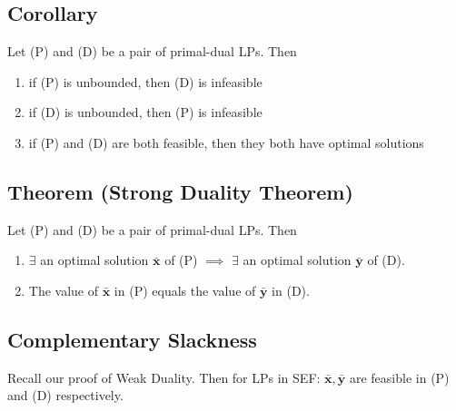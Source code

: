 \begin{thmbox}
    \subsection{Corollary}
    Let (P) and (D) be a pair of primal-dual LPs. Then
    \begin{enumerate}[(1)]
        \item if (P) is unbounded, then (D) is infeasible
        \item if (D) is unbounded, then (P) is infeasible
        \item if (P) and (D) are both feasible, then they both
        have optimal solutions
    \end{enumerate}
\end{thmbox}

\begin{thmbox}
    \subsection{Theorem (Strong Duality Theorem)}
    Let (P) and (D) be a pair of primal-dual LPs. Then
    \begin{enumerate}[(1)]
        \item $ \exists $ an optimal solution $ \bm{\bar{x}} $ of (P) $ \implies $ $\exists$ an optimal solution $ \bm{\bar{y}} $ of (D).
        \item The value of $ \bm{\bar{x}} $ in (P) equals the value of $ \bm{\bar{y}} $ in (D).
    \end{enumerate}
\end{thmbox}

\subsection{Complementary Slackness}
Recall our proof of Weak Duality. Then for LPs in SEF: 
$ \bm{\bar{x}}, \bm{\bar{y}} $ are feasible in (P) and (D) respectively.
